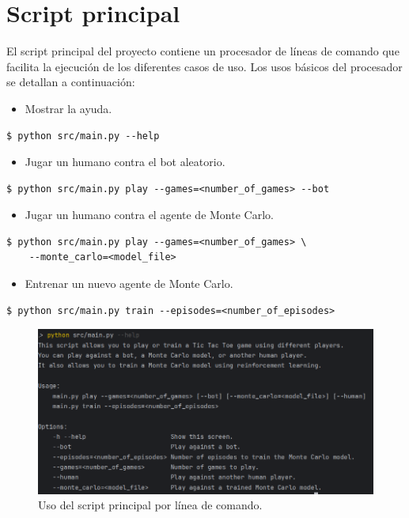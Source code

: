 
\chapter{Script principal} %

\label{Script principal}

El script principal del proyecto contiene un procesador de líneas de comando que facilita la ejecución de los diferentes casos de uso. Los usos básicos del procesador se detallan a continuación:

\begin{itemize}
    \item Mostrar la ayuda.
\end{itemize}
\begin{verbatim}
$ python src/main.py --help
\end{verbatim}

\begin{itemize}
    \item Jugar un humano contra el bot aleatorio.
\end{itemize}
\begin{verbatim}
$ python src/main.py play --games=<number_of_games> --bot
\end{verbatim}

\begin{itemize}
    \item Jugar un humano contra el agente de Monte Carlo.
\end{itemize}
\begin{verbatim}
$ python src/main.py play --games=<number_of_games> \
    --monte_carlo=<model_file>
\end{verbatim}


\begin{itemize}
    \item Entrenar un nuevo agente de Monte Carlo.
\end{itemize}
\begin{verbatim}
$ python src/main.py train --episodes=<number_of_episodes>
\end{verbatim}

\begin{figure}[htbp]
	\centering
	\includegraphics[width=\textwidth]{./Figures/command.png}
	\caption{Uso del script principal por línea de comando.}
	\label{fig:coverage}
\end{figure}